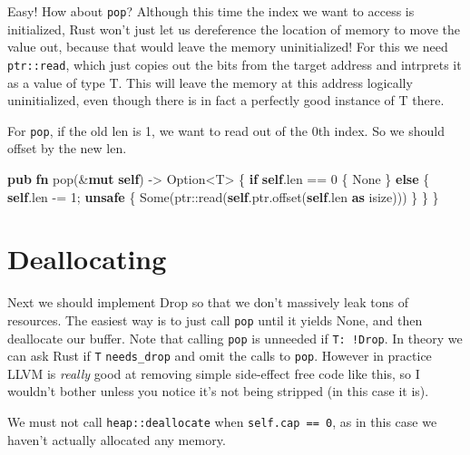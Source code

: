 \documentclass[a4paper,]{book}
\newenvironment{Shaded}{\begin{snugshade}}{\end{snugshade}}
\newcommand{\KeywordTok}[1]{\textcolor[rgb]{0.13,0.29,0.53}{\textbf{{#1}}}}
\newcommand{\DataTypeTok}[1]{\textcolor[rgb]{0.13,0.29,0.53}{{#1}}}
\newcommand{\DecValTok}[1]{\textcolor[rgb]{0.00,0.00,0.81}{{#1}}}
\newcommand{\ConstantTok}[1]{\textcolor[rgb]{0.00,0.00,0.00}{{#1}}}
\newcommand{\NormalTok}[1]{{#1}}
\begin{document}
Easy! How about \texttt{pop}? Although this time the index we want to
access is initialized, Rust won't just let us dereference the location
of memory to move the value out, because that would leave the memory
uninitialized! For this we need \texttt{ptr::read}, which just copies
out the bits from the target address and intrprets it as a value of type
T. This will leave the memory at this address logically uninitialized,
even though there is in fact a perfectly good instance of T there.

For \texttt{pop}, if the old len is 1, we want to read out of the 0th
index. So we should offset by the new len.

\begin{Shaded}
\begin{Highlighting}[]
\KeywordTok{pub} \KeywordTok{fn} \NormalTok{pop(&}\KeywordTok{mut} \KeywordTok{self}\NormalTok{) -> }\DataTypeTok{Option}\NormalTok{<T> \{}
    \KeywordTok{if} \KeywordTok{self}\NormalTok{.len == }\DecValTok{0} \NormalTok{\{}
        \ConstantTok{None}
    \NormalTok{\} }\KeywordTok{else} \NormalTok{\{}
        \KeywordTok{self}\NormalTok{.len -= }\DecValTok{1}\NormalTok{;}
        \KeywordTok{unsafe} \NormalTok{\{}
            \ConstantTok{Some}\NormalTok{(ptr::read(}\KeywordTok{self}\NormalTok{.ptr.offset(}\KeywordTok{self}\NormalTok{.len }\KeywordTok{as} \DataTypeTok{isize}\NormalTok{)))}
        \NormalTok{\}}
    \NormalTok{\}}
\NormalTok{\}}
\end{Highlighting}
\end{Shaded}

\section{Deallocating}\label{sec--vec-dealloc}

Next we should implement Drop so that we don't massively leak tons of
resources. The easiest way is to just call \texttt{pop} until it yields
None, and then deallocate our buffer. Note that calling \texttt{pop} is
unneeded if \texttt{T:\ !Drop}. In theory we can ask Rust if \texttt{T}
\texttt{needs\_drop} and omit the calls to \texttt{pop}. However in
practice LLVM is \emph{really} good at removing simple side-effect free
code like this, so I wouldn't bother unless you notice it's not being
stripped (in this case it is).

We must not call \texttt{heap::deallocate} when
\texttt{self.cap\ ==\ 0}, as in this case we haven't actually allocated
any memory.
\end{document}
